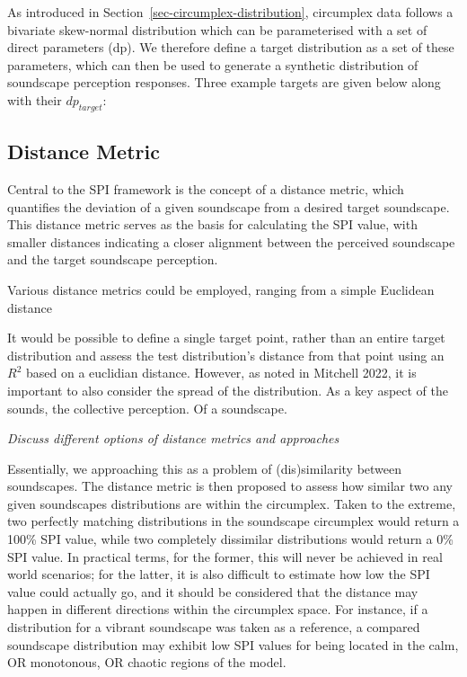 \documentclass[
  authoryear,
  preprint,
  3p]{elsarticle}
\begin{document}
As introduced in Section~\ref{sec-circumplex-distribution}, circumplex
data follows a bivariate skew-normal distribution which can be
parameterised with a set of direct parameters (dp). We therefore define
a target distribution as a set of these parameters, which can then be
used to generate a synthetic distribution of soundscape perception
responses. Three example targets are given below along with their
\(dp_{target}\):

\subsection{Distance Metric}\label{distance-metric}

Central to the SPI framework is the concept of a distance metric, which
quantifies the deviation of a given soundscape from a desired target
soundscape. This distance metric serves as the basis for calculating the
SPI value, with smaller distances indicating a closer alignment between
the perceived soundscape and the target soundscape perception.

Various distance metrics could be employed, ranging from a simple
Euclidean distance

It would be possible to define a single target point, rather than an
entire target distribution and assess the test distribution's distance
from that point using an \(R^2\) based on a euclidian distance. However,
as noted in Mitchell 2022, it is important to also consider the spread
of the distribution. As a key aspect of the sounds, the collective
perception. Of a soundscape.

\emph{Discuss different options of distance metrics and approaches}

Essentially, we approaching this as a problem of (dis)similarity between
soundscapes. The distance metric is then proposed to assess how similar
two any given soundscapes distributions are within the circumplex. Taken
to the extreme, two perfectly matching distributions in the soundscape
circumplex would return a 100\% SPI value, while two completely
dissimilar distributions would return a 0\% SPI value. In practical
terms, for the former, this will never be achieved in real world
scenarios; for the latter, it is also difficult to estimate how low the
SPI value could actually go, and it should be considered that the
distance may happen in different directions within the circumplex space.
For instance, if a distribution for a vibrant soundscape was taken as a
reference, a compared soundscape distribution may exhibit low SPI values
for being located in the calm, OR monotonous, OR chaotic regions of the
model.
\end{document}
